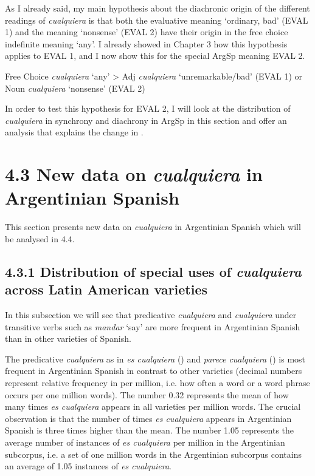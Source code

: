   As I already said, my main hypothesis about the diachronic origin of the different readings of \textit{cualquiera} is that both the evaluative meaning ‘ordinary, bad’ (EVAL 1) and the meaning ‘nonsense’ (EVAL 2) have their origin in the free choice indefinite meaning ‘any’. I already showed in Chapter 3 how this hypothesis applies to EVAL 1, and I now show this for the special ArgSp meaning EVAL 2.

    Free Choice \textit{cualquiera} ‘any’ > Adj \textit{cualquiera} ‘unremarkable/bad’ (EVAL 1) or Noun \textit{cualquiera} ‘nonsense’ (EVAL 2)

In order to test this hypothesis for EVAL 2, I will look at the distribution of \textit{cualquiera} in synchrony and diachrony in ArgSp in this section and offer an analysis that explains the change in . 

\section{\textbf{4.3} \textbf{New} \textbf{data} \textbf{on} \textbf{\textit{cualquiera} }\textbf{in} \textbf{Argentinian} \textbf{Spanish}}

This section presents new data on \textit{cualquiera} in Argentinian Spanish which will be analysed in 4.4.

\subsection{\textbf{4.3.1} \textbf{Distribution} \textbf{of} \textbf{special} \textbf{uses} \textbf{of} \textbf{\textit{cualquiera} }\textbf{across} \textbf{Latin} \textbf{American} \textbf{varieties}}

In this subsection we will see that predicative \textit{cualquiera} and \textit{cualquiera} under transitive verbs such as \textit{mandar} ‘say’ are more frequent in Argentinian Spanish than in other varieties of Spanish.

  The predicative \textit{cualquiera} as in \textit{es cualquiera} () and \textit{parece cualquiera} () is most frequent in Argentinian Spanish in contrast to other varieties (decimal numbers represent relative frequency in per million, i.e. how often a word or a word phrase occurs per one million words). The number 0.32 represents the mean of how many times \textit{es cualquiera} appears in all varieties per million words. The crucial observation is that the number of times \textit{es cualquiera} appears in Argentinian Spanish is three times higher than the mean. The number 1.05 represents the average number of instances of \textit{es cualquiera} per million in the Argentinian subcorpus, i.e. a set of one million words in the Argentinian subcorpus contains an average of 1.05 instances of \textit{es cualquiera}. 


